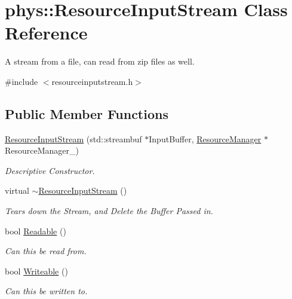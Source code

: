 \hypertarget{classphys_1_1ResourceInputStream}{
\section{phys::ResourceInputStream Class Reference}
\label{dc/d52/classphys_1_1ResourceInputStream}
}


A stream from a file, can read from zip files as well.  




{\ttfamily \#include $<$resourceinputstream.h$>$}

\subsection*{Public Member Functions}
\begin{DoxyCompactItemize}
\item 
\hyperlink{classphys_1_1ResourceInputStream_a890b739ac7f1c68108dc29f6887d2fa2}{ResourceInputStream} (std::streambuf $\ast$InputBuffer, \hyperlink{classphys_1_1ResourceManager}{ResourceManager} $\ast$ResourceManager\_\-)
\begin{DoxyCompactList}\small\item\em Descriptive Constructor. \item\end{DoxyCompactList}\item 
\hypertarget{classphys_1_1ResourceInputStream_a03b9d40f0b006edd6daf25e93084f80d}{
virtual \hyperlink{classphys_1_1ResourceInputStream_a03b9d40f0b006edd6daf25e93084f80d}{$\sim$ResourceInputStream} ()}
\label{dc/d52/classphys_1_1ResourceInputStream_a03b9d40f0b006edd6daf25e93084f80d}

\begin{DoxyCompactList}\small\item\em Tears down the Stream, and Delete the Buffer Passed in. \item\end{DoxyCompactList}\item 
bool \hyperlink{classphys_1_1ResourceInputStream_a4900f77dd452c2a2ddf47a76d36d85c3}{Readable} ()
\begin{DoxyCompactList}\small\item\em Can this be read from. \item\end{DoxyCompactList}\item 
bool \hyperlink{classphys_1_1ResourceInputStream_a6e7619bf3efd3b344fab92d326385009}{Writeable} ()
\begin{DoxyCompactList}\small\item\em Can this be written to. \item\end{DoxyCompactList}\end{DoxyCompactItemize}


